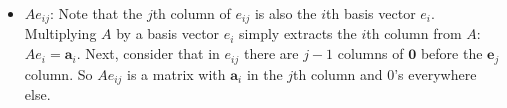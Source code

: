 \documentclass[main.tex]{subfiles}
\begin{document}
\begin{enumerate}[label=1.\arabic*]
\begin{itemize}
\[
  e_{ij}A =             \begin{blockarray}{cccccc}
    &   & j &   &  \\
    \begin{block}{c[ccccc]}
      &  &  &  &  &  \\
      &  &  &  &  &  \\
      i & & 1 &  &  &  \\
      & & & & & \\
      & & & & & \\
    \end{block}
  \end{blockarray}
  \left[\begin{array}{ccc}
      \horzbar & \mathbf{a}_1 & \horzbar \\
               & \vdots       &          \\
      \horzbar & \mathbf{a}_j & \horzbar \\
               & \vdots       &          \\
      \horzbar & \mathbf{a}_n & \horzbar\end{array}\right]
  =
  \begin{blockarray}{cccc}
    \begin{block}{c[ccc]}
      &  &  &   \\
      &  &  &  \\
      i & \horzbar & \mathbf{a}_j & \horzbar   \\
      & & &  \\
      & & & \\
    \end{block}
  \end{blockarray}
\]

\item $Ae_{ij}$: Note that the $j$th column of $e_{ij}$ is also the $i$th basis vector $e_i$.
Multiplying $A$ by a basis vector $e_i$ simply extracts the $i$th column from $A$:
$Ae_i = \mathbf{a}_i$. Next, consider that in $e_{ij}$ there are $j-1$ columns of $\mathbf{0}$ before the $\mathbf{e}_j$
column. So $Ae_{ij}$ is a matrix with $\mathbf{a}_i$ in the $j$th column and 0's everywhere else.



\end{itemize}
\end{enumerate}
\end{document}
